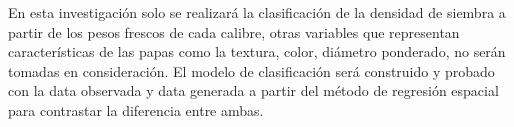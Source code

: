 En esta investigación solo se realizará la clasificación de la densidad de siembra a partir de los pesos frescos de cada calibre, otras variables que representan características de las papas como la textura, color, diámetro ponderado, no serán tomadas en consideración. El modelo de clasificación será construido y probado con la data observada y data generada a partir del método de regresión espacial para contrastar la diferencia entre ambas.
